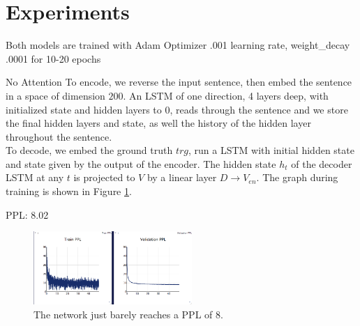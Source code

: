 \documentclass[11pt]{article}
\begin{document}
\section{Experiments}
Both models are trained with Adam Optimizer .001 learning rate, weight\_decay .0001 for 10-20 epochs 
\begin{subsection}{No Attention}
To encode, we reverse the input sentence, then embed the sentence in a space of dimension $200$. An LSTM of one direction, 4 layers deep, with initialized state and hidden layers to 0, reads through the sentence and we store the final hidden layers and state, as well the history of the hidden layer throughout the sentence.\\
To decode, we embed the ground truth $trg$, run a LSTM with initial hidden state and state given by the output of the encoder. The hidden state $h_t$ of the decoder LSTM at any $t$ is projected to $V$ by a linear layer $D \rightarrow V_{en}$. The graph during training is shown in Figure \ref{fig:noatt}.\\
\centerline{PPL: 8.02}

 \begin{figure}
  \centering
  \includegraphics[width=6cm]{imgs/noatt}
  \caption{\label{fig:noatt} The network just barely reaches a PPL of 8.}
\end{figure}


\end{subsection}
\end{document}

